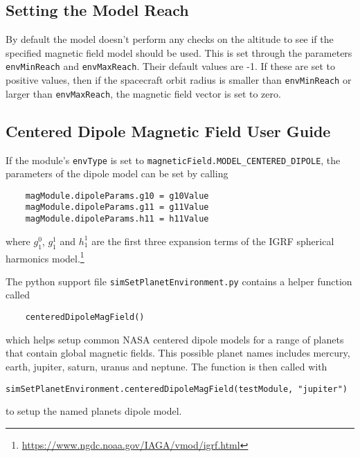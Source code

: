 \subsection{Setting the Model Reach}
By default the model doesn't perform any checks on the altitude to see if the specified magnetic field model should be used.  This is set through the parameters {\tt envMinReach} and {\tt envMaxReach}.  Their default values are -1.  If these are set to positive values, then if the spacecraft orbit radius is smaller than {\tt envMinReach} or larger than {\tt envMaxReach}, the magnetic field vector is set to zero.


\subsection{Centered Dipole Magnetic Field User Guide}
If the module's \verb|envType| is set to {\tt magneticField.MODEL\_CENTERED\_DIPOLE}, the parameters of the dipole model can be set by calling
\begin{verbatim}
    magModule.dipoleParams.g10 = g10Value
    magModule.dipoleParams.g11 = g11Value
    magModule.dipoleParams.h11 = h11Value
\end{verbatim}
where $g_{1}^{0}$, $g_{1}^{1}$ and $h_{1}^{1}$ are the first three expansion terms of the IGRF spherical harmonics model.\footnote{\url{https://www.ngdc.noaa.gov/IAGA/vmod/igrf.html}}

The python support file {\tt simSetPlanetEnvironment.py} contains a helper function called 
\begin{verbatim}
	centeredDipoleMagField()
\end{verbatim} 
which helps setup common NASA centered dipole models for a range of planets that contain global magnetic fields.  This possible planet names includes mercury, earth, jupiter, saturn, uranus and neptune.  The function is then called with
\begin{verbatim}
simSetPlanetEnvironment.centeredDipoleMagField(testModule, "jupiter")
\end{verbatim}
to setup the named planets dipole model.

